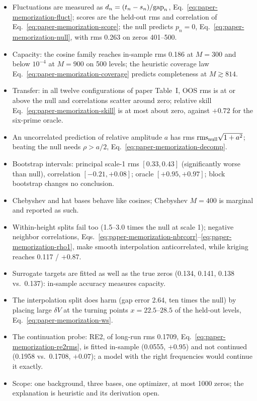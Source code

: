 \begin{itemize}
\item Fluctuations are measured as $d_n=(t_n-s_n)/\mathrm{gap}_n$, Eq.~\eqref{eq:paper-memorization-fluct}; scores are the held-out rms and correlation of Eq.~\eqref{eq:paper-memorization-score}; the null predicts $p_n=0$, Eq.~\eqref{eq:paper-memorization-null}, with rms 0.263 on zeros 401--500.
\item Capacity: the cosine family reaches in-sample rms 0.186 at $M=300$ and below $10^{-4}$ at $M=900$ on 500 levels; the heuristic coverage law Eq.~\eqref{eq:paper-memorization-coverage} predicts completeness at $M\gtrsim814$.
\item Transfer: in all twelve configurations of paper Table~I, OOS rms is at or above the null and correlations scatter around zero; relative skill Eq.~\eqref{eq:paper-memorization-skill} is at most about zero, against $+0.72$ for the six-prime oracle.
\item An uncorrelated prediction of relative amplitude $a$ has rms $\mathrm{rms}_{\rm null}\sqrt{1+a^2}$; beating the null needs $\rho>a/2$, Eq.~\eqref{eq:paper-memorization-decomp}.
\item Bootstrap intervals: principal scale-1 rms $[0.33,0.43]$ (significantly worse than null), correlation $[-0.21,+0.08]$; oracle $[+0.95,+0.97]$; block bootstrap changes no conclusion.
\item Chebyshev and hat bases behave like cosines; Chebyshev $M=400$ is marginal and reported as such.
\item Within-height splits fail too (1.5--3.0 times the null at scale 1); negative neighbor correlations, Eqs.~\eqref{eq:paper-memorization-nbrcorr}--\eqref{eq:paper-memorization-rho1}, make smooth interpolation anticorrelated, while kriging reaches 0.117 / $+0.87$.
\item Surrogate targets are fitted as well as the true zeros (0.134, 0.141, 0.138 vs.\ 0.137): in-sample accuracy measures capacity.
\item The interpolation split does harm (gap error 2.64, ten times the null) by placing large $\delta V$ at the turning points $x=22.5$--$28.5$ of the held-out levels, Eq.~\eqref{eq:paper-memorization-ws}.
\item The continuation probe: RE2, of long-run rms 0.1709, Eq.~\eqref{eq:paper-memorization-re2rms}, is fitted in-sample (0.0555, $+0.95$) and not continued (0.1958 vs.\ 0.1708, $+0.07$); a model with the right frequencies would continue it exactly.
\item Scope: one background, three bases, one optimizer, at most 1000 zeros; the explanation is heuristic and its derivation open.
\end{itemize}

